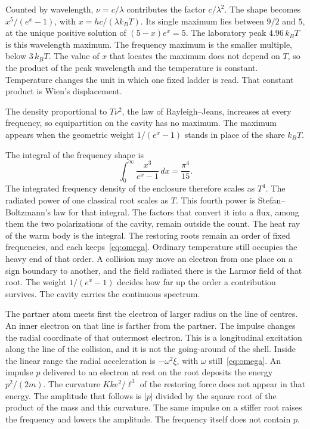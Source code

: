 \documentclass[a4paper]{article}
\begin{document}
Counted by wavelength, \(\nu=c/\lambda\) contributes the factor \(c/\lambda^{2}\). The shape becomes \(x^{5}/(e^{x}-1)\), with \(x=hc/(\lambda k_B T)\). Its single maximum lies between \(9/2\) and \(5\), at the unique positive solution of \((5-x)e^{x}=5\). The laboratory peak \(4.96\,k_B T\) is this wavelength maximum. The frequency maximum is the smaller multiple, below \(3\,k_B T\). The value of \(x\) that locates the maximum does not depend on \(T\), so the product of the peak wavelength and the temperature is constant. Temperature changes the unit in which one fixed ladder is read. That constant product is Wien's displacement.

The density proportional to \(T\nu^{2}\), the law of Rayleigh--Jeans, increases at every frequency, so equipartition on the cavity has no maximum. The maximum appears when the geometric weight \(1/(e^{x}-1)\) stands in place of the share \(k_B T\).

The integral of the frequency shape is
\[
\int_{0}^{\infty}\frac{x^{3}}{e^{x}-1}\,dx=\frac{\pi^{4}}{15}.
\]
The integrated frequency density of the enclosure therefore scales as \(T^{4}\). The radiated power of one classical root scales as \(T\). This fourth power is Stefan--Boltzmann's law for that integral. The factors that convert it into a flux, among them the two polarizations of the cavity, remain outside the count. The heat ray of the warm body is the integral. The restoring roots remain an order of fixed frequencies, and each keeps~\eqref{eq:omega}. Ordinary temperature still occupies the heavy end of that order. A collision may move an electron from one place on a sign boundary to another, and the field radiated there is the Larmor field of that root. The weight \(1/(e^{x}-1)\) decides how far up the order a contribution survives. The cavity carries the continuous spectrum.

The partner atom meets first the electron of larger radius on the line of centres. An inner electron on that line is farther from the partner. The impulse changes the radial coordinate of that outermost electron. This is a longitudinal excitation along the line of the collision, and it is not the going-around of the shell. Inside the linear range the radial acceleration is \(-\omega^{2}\xi\), with \(\omega\) still~\eqref{eq:omega}. An impulse \(p\) delivered to an electron at rest on the root deposits the energy \(p^{2}/(2m)\). The curvature \(K k e^{2}/\ell^{3}\) of the restoring force does not appear in that energy. The amplitude that follows is \(|p|\) divided by the square root of the product of the mass and this curvature. The same impulse on a stiffer root raises the frequency and lowers the amplitude. The frequency itself does not contain \(p\).
\end{document}
